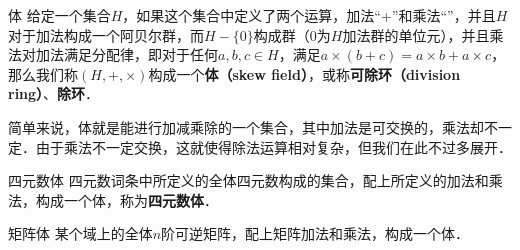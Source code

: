 

\begin{definition}{体}
给定一个集合$H$，如果这个集合中定义了两个运算，加法“+”和乘法“\times”，并且$H$对于加法构成一个阿贝尔群，而$H-\{0\}$构成群（$0$为$H$加法群的单位元），并且乘法对加法满足分配律，即对于任何$a, b, c\in H$，满足$a\times(b+c)=a\times b+a\times c$，那么我们称$(H, +, \times)$构成一个\textbf{体（skew field）}，或称\textbf{可除环（division ring）}、\textbf{除环}．
\end{definition}

简单来说，体就是能进行加减乘除的一个集合，其中加法是可交换的，乘法却不一定．由于乘法不一定交换，这就使得除法运算相对复杂，但我们在此不过多展开．

\begin{example}{四元数体}
四元数词条中所定义的全体四元数构成的集合，配上所定义的加法和乘法，构成一个体，称为\textbf{四元数体}．
\end{example}

\begin{example}{矩阵体}
某个域上的全体$n$阶可逆矩阵，配上矩阵加法和乘法，构成一个体．
\end{example}
